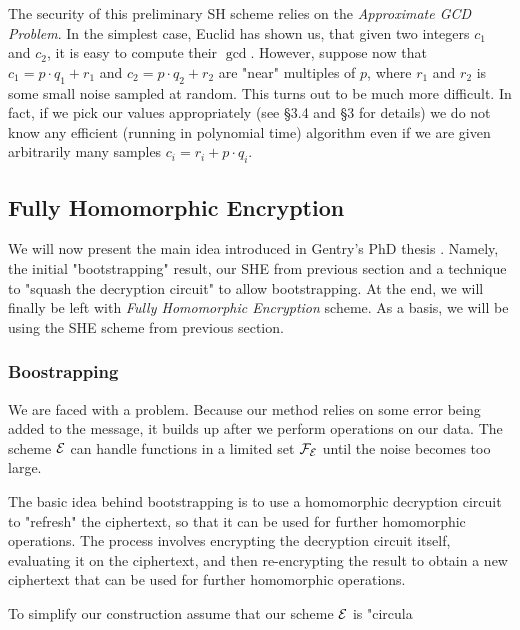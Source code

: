 The security of this preliminary SH scheme relies on the \textit{Approximate GCD Problem}. In the simplest case, Euclid has shown us, that given two integers $c_1$ and $c_2$, it is easy to compute their $\gcd$. However, suppose now that $c_1 = p \cdot q_1 + r_1$ and $c_2 = p \cdot q_2 + r_2$ are "near" multiples of $p$, where $r_1$ and $r_2$ is some small noise sampled at random. This turns out to be much more difficult. In fact, if we pick our values appropriately (see \cite{easy_fhe} \S 3.4 and \cite{int_scheme} \S 3 for details) we do not know any efficient (running in polynomial time) algorithm even if we are given arbitrarily many samples $c_i = r_i + p \cdot q_i$. \\

\subsection{Fully Homomorphic Encryption}
We will now present the main idea introduced in Gentry's PhD thesis \cite{gentry_phd}. Namely, the initial "bootstrapping" result, our SHE from previous section and a technique to "squash the decryption circuit" to allow bootstrapping. At the end, we will finally be left with \textit{Fully Homomorphic Encryption} scheme. As a basis, we will be using the SHE scheme from previous section.

\subsubsection*{Boostrapping}
We are faced with a problem. Because our method relies on some error being added to the message, it builds up after we perform operations on our data. The scheme $\mathcal{E}$ can handle functions in a limited set $\mathcal{F}_{\mathcal{E}}$ until the noise becomes too large.

The basic idea behind bootstrapping is to use a homomorphic decryption circuit to "refresh" the ciphertext, so that it can be used for further homomorphic operations. The process involves encrypting the decryption circuit itself, evaluating it on the ciphertext, and then re-encrypting the result to obtain a new ciphertext that can be used for further homomorphic operations.

To simplify our construction assume that our scheme $\mathcal{E}$ is "circula